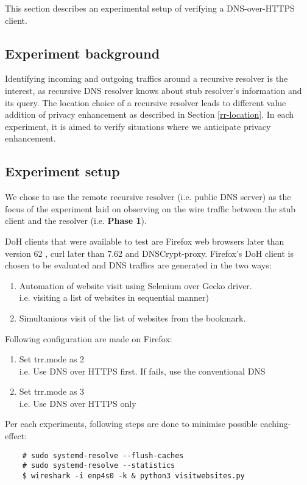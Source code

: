 This section describes an experimental setup of verifying a DNS-over-HTTPS client.

\subsection{Experiment background}
Identifying incoming and outgoing traffics around a recursive resolver is the interest, as recursive DNS resolver knows about stub resolver's information and its query.
The location choice of a recursive resolver leads to different value addition of privacy enhancement as described in Section \ref{rr-location}. In each experiment, it is aimed to verify situations where we anticipate privacy enhancement.

\subsection{Experiment setup}\label{simulation}
We chose to use the remote recursive resolver (i.e. public DNS server) as the focus of the experiment laid on observing on the wire traffic between the stub client and the resolver (i.e. \textbf{Phase 1}).

DoH clients that were available to test are Firefox web browsers later than version 62 \cite{FirefoxDoH}, curl later than 7.62 \cite{CurlDoH} and DNSCrypt-proxy.
Firefox's DoH client is chosen to be evaluated and DNS traffics are generated in the two ways:
\begin{enumerate}
    \item Automation of website visit using Selenium over Gecko driver.
    \\i.e. visiting a list of websites in sequential manner)
    \item Simultanious visit of the list of websites from the bookmark.
\end{enumerate}
Following configuration are made on Firefox:
\begin{enumerate}
    \item Set trr.mode as 2
    \\i.e. Use DNS over HTTPS first. If fails, use the conventional DNS
    \item Set trr.mode as 3
    \\i.e. Use DNS over HTTPS only
\end{enumerate}
Per each experiments, following steps are done to minimise possible caching-effect:
\begin{lstlisting}
    # sudo systemd-resolve --flush-caches
    # sudo systemd-resolve --statistics
    $ wireshark -i enp4s0 -k & python3 visitwebsites.py
\end{lstlisting}
